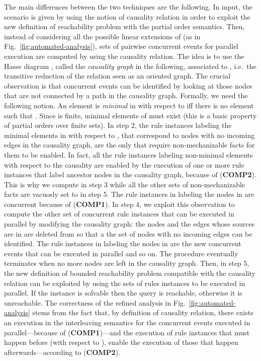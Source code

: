 \documentclass[conference]{llncs}
\begin{document}
{\begin{figure}[t]
\end{figure}
The main differences between the two techniques are the following.  In
input, the scenario is given by using the notion of causality relation
in order to exploit the new definition of reachability problem with
the partial order semantics.  Then, instead of considering all the
possible linear extensions of  (as in
Fig.~\ref{fig:automated-analysis}), sets of pairwise concurrent events
for parallel execution are computed by using the causality relation.
The idea is to use the Hasse diagram , called the
\emph{causality graph} in the following, associated to ,
i.e.\ the transitive reduction of the relation  seen as an
oriented graph.  The crucial observation is that concurrent events can
be identified by looking at those nodes that are not connected by a
path in the causality graph.  Formally, we need the following notion.
An element  is \emph{minimal} in  with respect to  iff
there is no element  such that .  Since  is
finite, minimal elements of  must exist (this is a basic
property of partial orders over finite sets).  In step 2, the rule
instances labeling the minimal elements in  with respect to
, that correspond to nodes with no incoming edges in the
causality graph, are the only that require non-mechanizable facts for
them to be enabled.  In fact, all the rule instances labeling
non-minimal elements with respect to the causality are enabled by the
execution of one or more rule instances that label ancestor nodes in
the causality graph, because of (\textbf{COMP2}).  This is why we
compute  in step 3 while all the other sets of non-mechanizable
facts are vacuosly set to  in step 5.  The rule
instances in  labeling the nodes in  are concurrent
because of (\textbf{COMP1}).  In step 4, we exploit this observation
to compute the other set of concurrent rule instances that can be
executed in parallel by modifying the causality graph: the nodes and
the edges whose sources are in  are deleted from 
so that a the set  of nodes with no incoming edges can be
identified.  The rule instances in  labeling the nodes in
 are the new concurrent events that can be executed in parallel
and so on.  The procedure eventually terminates when no more nodes are
left in the causality graph.  Then, in step 5, the new definition of
bounded reachability problem compatible with the causality relation
 can be exploited by using the sets 
of rules instances to be executed in parallel.  If the instance is
solvable then the query  is reachable, otherwise it is unreachable.
The correctness of the refined analysis in
Fig.~\ref{fig:automated-analysis} stems from the fact that, by
definition of causality relation, there exists an execution in the
interleaving semantics for the concurrent events executed in
parallel---because of (\textbf{COMP1})---and the execution of rule
instances that must happen before (with respect to ), enable
the execution of those that happen afterwards---according to
(\textbf{COMP2}).

}
\end{document}
